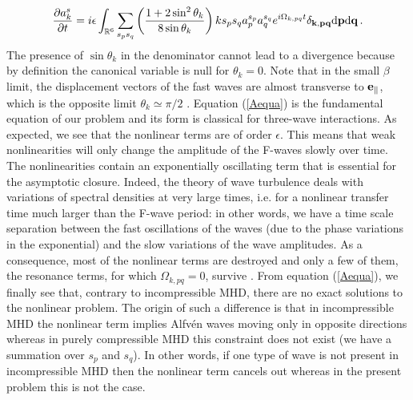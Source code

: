 \documentclass{jpp}
\def\be{\begin{equation}}
\def\ee{\end{equation}}
\def\kk{{\bf k}}
\def\pp{{\bf p}}
\def\qq{{\bf q}}
\def\dd{\mathrm{d}}
\begin{document}
\be
{\partial a_k^s \over \partial t} = i \epsilon \int_{\mathbb{R}^6} \sum_{s_p s_q} \left(\frac{1 + 2 \sin^2 \theta_k}{8 \sin \theta_k}\right) k s_p s_q
a_p^{s_p} a_q^{s_q} e^{i\Omega_{k,pq} t} \delta_{\kk,\pp\qq} \dd \pp \dd \qq \, . \label{Aequa}
\ee
The presence of $\sin \theta_k$ in the denominator cannot lead to a divergence because by definition the canonical variable is null for $\theta_k = 0$. 
Note that in the small $\beta$ limit, the displacement vectors of the fast waves are almost transverse to ${\bf e_\parallel}$, which is the opposite limit $\theta_k \simeq \pi/2$ \citep{GaltierCUP2016}.
%
Equation (\ref{Aequa}) is the fundamental equation of our problem and its form is classical for three-wave interactions. As expected, we see that the nonlinear terms are of order $\epsilon$. This means that weak nonlinearities will only change the amplitude of the F-waves slowly over time. 
The nonlinearities contain an exponentially oscillating term that is essential for the asymptotic closure. Indeed, the theory of wave turbulence deals with variations of spectral densities at very large times, i.e. for a nonlinear transfer time much larger than the F-wave period: in other words, we have a time scale separation between the fast oscillations of the waves (due to the phase variations in the exponential) and the slow variations of the wave amplitudes. As a consequence, most of the nonlinear terms are destroyed and only a few of them, the resonance terms, for which $\Omega_{k,pq} =0$, survive \citep{Benney1966,Benney1967,Benney1967b}. 
From equation (\ref{Aequa}), we finally see that, contrary to incompressible MHD, there are no exact solutions to the nonlinear problem. The origin of such a difference is that in incompressible MHD the nonlinear term implies Alfv\'en waves moving only in opposite directions \citep{Galtier2000} whereas in purely compressible MHD this constraint does not exist (we have a summation over $s_p$ and $s_q$). In other words, if one type of wave is not present in incompressible MHD then the nonlinear term cancels out whereas in the present problem this is not the case. 
\end{document}
